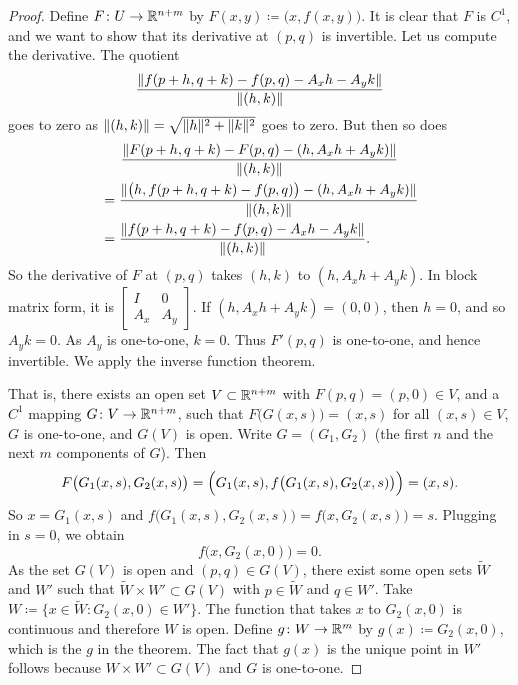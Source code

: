 \begin{proof}
Define $F \colon U \to {\mathbb{R}}^{n+m}$ by $F(x,y) \coloneqq \bigl(x,f(x,y)\bigr)$.
It is clear that $F$ is $C^1$, and we want to show that its derivative
at $(p,q)$ is invertible.
Let us compute the derivative.  The quotient
\begin{equation*}
\frac{\lVert {f(p+h,q+k) - f(p,q) - A_x h - A_y k} \rVert}{\lVert {(h,k)} \rVert}
\end{equation*}
goes to zero as $\lVert {(h,k)} \rVert = \sqrt{\lVert {h} \rVert^2+\lVert {k} \rVert^2}$ goes to zero.
But then so does
\begin{multline*}
\frac{\lVert {F(p+h,q+k)-F(p,q) - (h,A_x h+A_y k)} \rVert}{\lVert {(h,k)} \rVert}
\\
\begin{aligned}
& =
\frac{\lVert {\bigl(h,f(p+h,q+k)-f(p,q)\bigr) - (h,A_x h+A_y
k)} \rVert}{\lVert {(h,k)} \rVert}
\\
& =
\frac{\lVert {f(p+h,q+k) - f(p,q) - A_x h - A_y k} \rVert}{\lVert {(h,k)} \rVert} .
\end{aligned}
\end{multline*}
So the derivative of $F$ at $(p,q)$ takes $(h,k)$ to $(h,A_x h+A_y k)$.
In block matrix form, it is
$\left[\begin{smallmatrix}I & 0\\A_x & A_y\end{smallmatrix}\right]$.  If 
$(h,A_x h+A_y k) = (0,0)$, then $h=0$, and so $A_y k = 0$.  As $A_y$ is
one-to-one, $k=0$.  Thus $F'(p,q)$ is one-to-one, and hence invertible.
We apply the inverse function theorem.

That is, there exists an open set $V \subset {\mathbb{R}}^{n+m}$ with
$F(p,q) = (p,0) \in V$,
and a  $C^1$
mapping $G \colon V \to {\mathbb{R}}^{n+m}$, such that $F\bigl(G(x,s)\bigr) = (x,s)$ for
all $(x,s) \in V$, $G$ is one-to-one, and $G(V)$ is open. %
Write $G = (G_1,G_2)$ (the first $n$ and the next $m$ components of $G$).
Then
\begin{equation*}
F\bigl(G_1(x,s),G_2(x,s)\bigr) = \Bigl(G_1(x,s),f\bigl(G_1(x,s),G_2(x,s) \bigr)\Bigr)
= (x,s) .
\end{equation*}
So $x = G_1(x,s)$ and $f\bigl(G_1(x,s),G_2(x,s)\bigr) = f\bigl(x,G_2(x,s)\bigr) = s$.
Plugging in $s=0$, we obtain
\begin{equation*}
f\bigl(x,G_2(x,0)\bigr) = 0 .
\end{equation*}
As the set $G(V)$ is open and $(p,q) \in G(V)$,
there exist some open sets
$\widetilde{W}$ and $W'$ such that $\widetilde{W} \times W' \subset G(V)$ with $p
\in \widetilde{W}$ and
$q \in W'$.
Take $W \coloneqq \bigl\{ x \in \widetilde{W} : G_2(x,0) \in W' \bigr\}$.
The function that takes $x$ to $G_2(x,0)$ is continuous and therefore $W$
is open.
Define
$g \colon W \to {\mathbb{R}}^m$ by $g(x) \coloneqq G_2(x,0)$, which is the $g$ in the theorem.
The fact that $g(x)$ is the unique point in $W'$ follows because $W \times
W' \subset G(V)$ and $G$ is one-to-one.


\end{proof}

